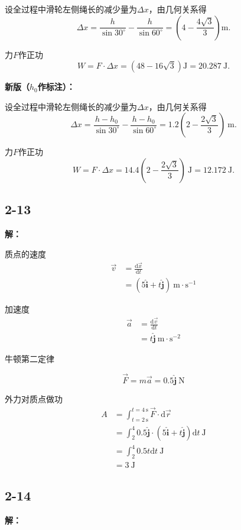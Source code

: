 \documentclass[twocolumn]{ctexart}
\newcommand{\sol}[1]{\subsection*{#1}\noindent\textbf{解：}

}
\begin{document}
	设全过程中滑轮左侧绳长的减少量为$\Delta x$，由几何关系得
	$$\Delta x=\frac{h}{\sin30^\circ{}}-\frac{h}{\sin60^\circ{}}=\left(4-\frac{4\sqrt{3}}{3}\right)\mathrm{m}.$$
	
	力$F$作正功
	$$W=F\cdot\Delta x=\left(48-16\sqrt{3}\right)\mathrm{J}=20.287\ \mathrm{J}.$$
	
	\noindent
	\textbf{新版（$h_0$作标注）：}
	
	设全过程中滑轮左侧绳长的减少量为$\Delta x$，由几何关系得
	$$\Delta x=\frac{h-h_0}{\sin30^\circ{}}-\frac{h-h_0}{\sin60^\circ{}}=1.2\left(2-\frac{2\sqrt{3}}{3}\right)\ \mathrm{m}.$$
	
	力$F$作正功
	$$W=F\cdot\Delta x=14.4\left(2-\frac{2\sqrt{3}}{3}\right)\ \mathrm{J}=12.172\ \mathrm{J}.$$
	
	\sol{2-13}
	质点的速度
	\begin{align*}
		\vec{v}&=\frac{\mathrm{d}\vec{x}}{\mathrm{d}t}\\
		&=\left(5\hat{\mathbf{i}}+t\hat{\mathbf{j}}\right)\ \mathrm{m\cdot s^{-1}}
	\end{align*}
	
	加速度
	\begin{align*}
		\vec{a}&=\frac{\mathrm{d}\vec{v}}{\mathrm{d}t}\\
		&=t\hat{\mathbf{j}}\ \mathrm{m\cdot s^{-2}}
	\end{align*}

	牛顿第二定律
	
	$$\vec{F}=m\vec{a}=0.5\hat{\mathbf{j}}\ \mathrm{N}$$
	
	外力对质点做功
	\begin{align*}
		A&=\int_{t=2\ \mathrm{s}}^{t=4\ \mathrm{s}}\vec{F}\cdot\mathrm{d}\vec{r}\\
		&=\int_{2}^{4 }0.5\hat{\mathbf{j}}\cdot\left(5\hat{\mathbf{i}}+t\hat{\mathbf{j}}\right)\mathrm{d}t\ \mathrm{J}\\
		&=\int_{2}^{4}0.5t\mathrm{d}t\ \mathrm{J}\\
		&=3\ \mathrm{J}
	\end{align*}
	
	\sol{2-14}
	
\end{document}
